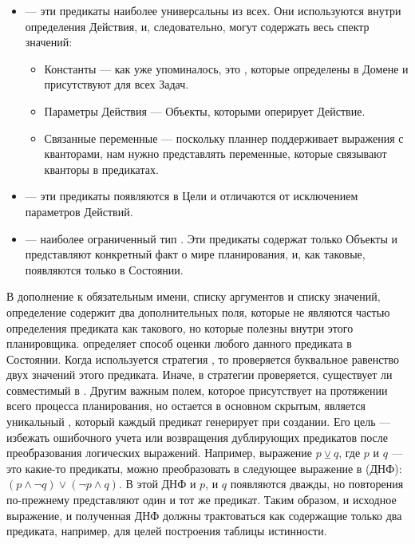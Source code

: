 {\sloppy
\begin{itemize}
  \item {} --- эти предикаты наиболее универсальны
    из всех. Они используются внутри определения Действия,
    и, следовательно, могут содержать весь спектр значений:
    \begin{itemize}
      \item Константы --- как уже упоминалось,
        это , которые определены в Домене
        и присутствуют для всех Задач.
      \item Параметры Действия --- Объекты, которыми оперирует Действие.
      \item Связанные переменные --- поскольку планнер поддерживает выражения
        с кванторами, нам нужно представлять переменные,
        которые связывают кванторы в предикатах.
    \end{itemize}
  \item {} --- эти предикаты появляются в Цели
    и отличаются от  исключением параметров Действий.
  \item {} --- наиболее ограниченный тип .
    Эти предикаты содержат только Объекты и представляют конкретный факт о мире планирования,
    и, как таковые, появляются только в Состоянии.
\end{itemize}
}


В дополнение к обязательным имени, списку аргументов и списку значений,
определение  содержит два дополнительных поля,
которые не являются частью определения предиката как такового,
но которые полезны внутри этого планировщика.
 определяет способ оценки
любого данного предиката в Состоянии.
Когда используется стратегия , то проверяется буквальное равенство
двух значений этого предиката.
Иначе, в стратегии  проверяется, существует ли совместимый  в .
Другим важным полем, которое присутствует на протяжении всего процесса планирования,
но остается в основном скрытым, является уникальный ,
который каждый предикат генерирует при создании.
Его цель --- избежать ошибочного учета или возвращения дублирующих
предикатов после преобразования логических выражений.
Например, выражение $p \veebar q$, где $p$ и $q$ --- это какие-то предикаты,
можно преобразовать в следующее выражение в  (ДНФ):
$\left(p \land \lnot q\right) \lor \left(\lnot p \land q\right)$.
В этой ДНФ и $p$, и $q$ появляются дважды,
но повторения по-прежнему представляют один и тот же предикат.
Таким образом, и исходное выражение, и полученная ДНФ должны трактоваться
как содержащие только два предиката, например, для целей
построения таблицы истинности.

